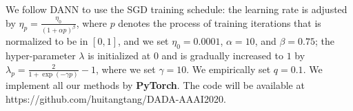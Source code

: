 \documentclass[letterpaper]{article} \usepackage{aaai20}  \usepackage{times}  \usepackage{helvet} \usepackage{courier}  \usepackage[hyphens]{url}  \usepackage{graphicx} \urlstyle{rm} \def\UrlFont{\rm}  \usepackage{graphicx}  \frenchspacing  \setlength{\pdfpagewidth}{8.5in}  \setlength{\pdfpageheight}{11in}
\begin{document}
We follow DANN \cite{dann} to use the SGD training schedule: the learning rate is adjusted by $\eta_p=\frac{\eta_0}{(1+\alpha p)^\beta}$, where $p$ denotes the process of training iterations that is normalized to be in $[0, 1]$, and we set $\eta_0 = 0.0001$, $\alpha = 10$, and $\beta = 0.75$; the hyper-parameter $\lambda$ is initialized at $0$ and is gradually increased to $1$ by $\lambda_{p}=\frac{2}{1+\exp(-\gamma p)}-1$, where we set $\gamma = 10$. We empirically set $q=0.1$. We implement all our methods by \textbf{PyTorch}. The code will be available at https://github.com/huitangtang/DADA-AAAI2020.

\begin{table*}[!t]
	\caption{Ablation studies using Office-31 based on ResNet-50. Please refer to the main text for how they are defined.}
	\label{table:alter_base_office31} 
	\begin{center}
	\end{center}
\end{table*}
\end{document}

